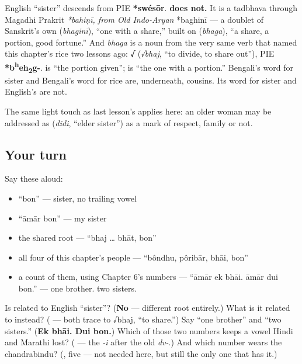 \begin{cousinweb}
English \textquotedblleft{}sister\textquotedblright{} descends from PIE \textbf{*swésōr}. \textbf{ does not.} It is a tadbhava through Magadhi Prakrit \emph{*bahiṇī, from Old Indo-Aryan }*baghinī — a doublet of Sanskrit's own \textbf{} (\emph{bhaginī}), \textquotedblleft{}one with a share,\textquotedblright{} built on \textbf{} (\emph{bhaga}), \textquotedblleft{}a share, a portion, good fortune.\textquotedblright{} And \emph{bhaga} is a noun from the very same verb that named this chapter's rice two lessons ago: \textbf{√} (\emph{√bhaj}, \textquotedblleft{}to divide, to share out\textquotedblright{}), PIE \textbf{*b\textsuperscript{h}eh\textsubscript{2}g-}.  is \textquotedblleft{}the portion given\textquotedblright{};  is \textquotedblleft{}the one with a portion.\textquotedblright{} Bengali's word for sister and Bengali's word for rice are, underneath, cousins. Its word for sister and English's are not.

The same light touch as last lesson's  applies here: an older woman may be addressed as \textbf{} (\emph{didi}, \textquotedblleft{}elder sister\textquotedblright{}) as a mark of respect, family or not.
\end{cousinweb}

\subsection*{Your turn}
Say these aloud:

\begin{itemize}
\raggedright
  \item \textquotedblleft{}bon\textquotedblright{} — sister, no trailing vowel
  \item \textquotedblleft{}āmār bon\textquotedblright{} — my sister
  \item the shared root — \textquotedblleft{}bhaj … bhāt, bon\textquotedblright{}
  \item all four of this chapter's people — \textquotedblleft{}bôndhu, pôribār, bhāi, bon\textquotedblright{}
  \item a count of them, using Chapter 6's numbers — \textquotedblleft{}āmār ek bhāi. āmār dui bon.\textquotedblright{} — one brother. two sisters.
\end{itemize}

\begin{tcolorbox}[breakable,colback=teal!4,colframe=teal!35!black,title={Before you move on}]
Is  related to English \textquotedblleft{}sister\textquotedblright{}? (\textbf{No} — different root entirely.) What is it related to instead? (\textbf{} — both trace to √bhaj, \textquotedblleft{}to share.\textquotedblright{}) Say \textquotedblleft{}one brother\textquotedblright{} and \textquotedblleft{}two sisters.\textquotedblright{} (\textbf{Ek bhāi. Dui bon.}) Which of those two numbers keeps a vowel Hindi and Marathi lost? (\textbf{} — the \emph{-i} after the old \emph{dv-}.) And which number wears the chandrabindu? (\textbf{}, five — not needed here, but still the only one that has it.)
\end{tcolorbox}
